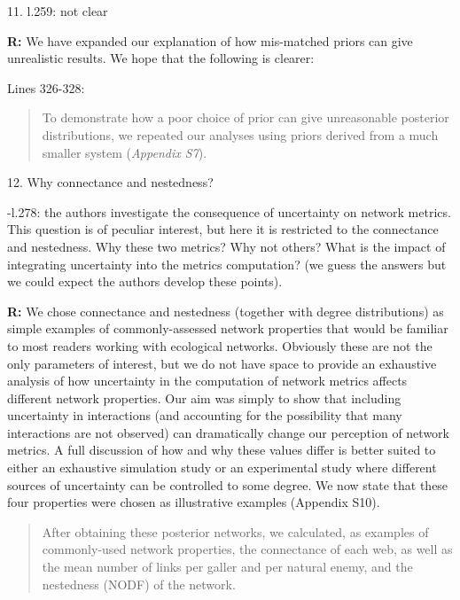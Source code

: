 \documentclass[12pt]{letter}
\newenvironment{refquote}{\bigskip \begin{it}}{\end{it}\smallskip}
\begin{document}
	11. l.259: not clear 
	
		
		\textbf{R:} We have expanded our explanation of how mis-matched priors can give unrealistic results. We hope that the following is clearer:


		Lines 326-328:


		\begin{quotation}
			To demonstrate how a poor choice of prior can give unreasonable posterior distributions, we repeated our analyses using priors derived from a much smaller system (\emph{Appendix S7}). 
		\end{quotation}


	12. Why connectance and nestedness?


		\begin{refquote}
			-l.278: the authors investigate the consequence of uncertainty on network metrics. This question is of peculiar interest, but here it is restricted to the connectance and nestedness. Why these two metrics? Why not others? What is the impact of integrating uncertainty into the metrics computation? (we guess the answers but we could expect the authors develop these points).
		\end{refquote}


		\textbf{R:} We chose connectance and nestedness (together with degree distributions) as simple examples of commonly-assessed network properties that would be familiar to most readers working with ecological networks. Obviously these are not the only parameters of interest, but we do not have space to provide an exhaustive analysis of how uncertainty in the computation of network metrics affects different network properties. Our aim was simply to show that including uncertainty in interactions (and accounting for the possibility that many interactions are not observed) can dramatically change our perception of network metrics. A full discussion of how and why these values differ is better suited to either an exhaustive simulation study or an experimental study where different sources of uncertainty can be controlled to some degree. We now state that these four properties were chosen as illustrative examples (Appendix S10).


		\begin{quotation}
			After obtaining these posterior networks, we calculated, as examples of commonly-used network properties, the connectance of each web, as well as the mean number of links per galler and per natural enemy, and the nestedness (NODF) of the network.
		\end{quotation}
\end{document}
